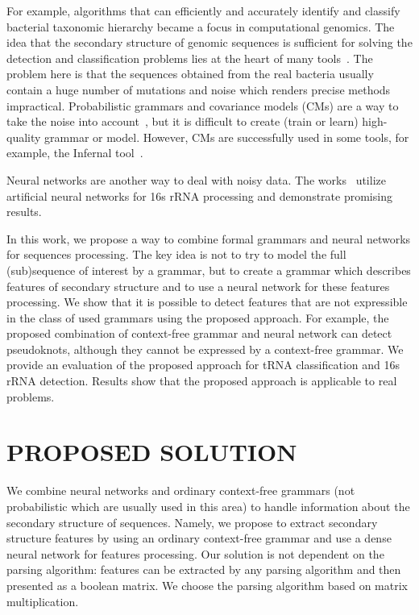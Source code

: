 \documentclass[a4paper,twoside]{article}
\begin{document}
For example, algorithms that can efficiently and accurately identify and classify bacterial taxonomic hierarchy became a focus in computational genomics.
The idea that the secondary structure of genomic sequences is sufficient for solving the detection and classification problems lies at the heart of many tools~\cite{GrammarsRNA,PCFG,meta,LWPCFG}.
The problem here is that the sequences obtained from the real bacteria usually contain a huge number of mutations and noise which renders precise methods impractical. 
Probabilistic grammars and covariance models (CMs) are a way to take the noise into account~\cite{EddyDurbin}, but it is difficult to create (train or learn) high-quality grammar or model.
However, CMs are successfully used in some tools, for example, the Infernal tool~\cite{Infernal}.

Neural networks are another way to deal with noisy data. 
The works~\cite{Humidor,ANN} utilize artificial neural networks for 16s rRNA processing and demonstrate promising results.

In this work, we propose a way to combine formal grammars and neural networks for sequences processing.
The key idea is not to try to model the full (sub)sequence of interest by a grammar, but to create a grammar which describes features of secondary structure and to use a neural network for these features processing.
We show that it is possible to detect features that are not expressible in the class of used grammars using the proposed approach.
For example, the proposed combination of context-free grammar and neural network can detect pseudoknots, although they cannot be expressed by a context-free grammar.
We provide an evaluation of the proposed approach for tRNA classification and 16s rRNA detection.
Results show that the proposed approach is applicable to real problems.

\section{\uppercase{Proposed solution}}
\label{sec:proposedSolution}

\noindent We combine neural networks and ordinary context-free grammars (not probabilistic which are usually used in this area) to handle information about the secondary structure of sequences. 
Namely, we propose to extract secondary structure features by using an ordinary context-free grammar and use a dense neural network for features processing.
Our solution is not dependent on the parsing algorithm: features can be extracted by any parsing algorithm and then presented as a boolean matrix. We choose the parsing algorithm based on matrix multiplication.
\end{document}
